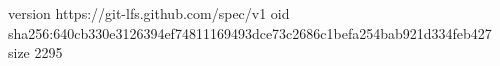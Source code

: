 version https://git-lfs.github.com/spec/v1
oid sha256:640cb330e3126394ef74811169493dce73c2686c1befa254bab921d334feb427
size 2295
